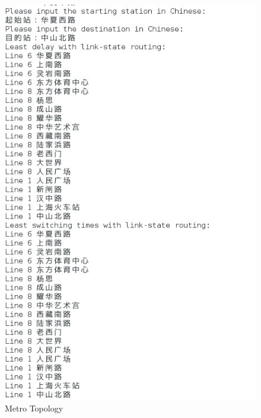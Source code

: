 \documentclass[12pt]{article}
\begin{document}
\begin{figure}[H]
	\begin{center}
		\includegraphics[width=1\textwidth]{figures/5}
	\end{center}
	\caption{Metro Topology}
	\label{1}
\end{figure}
\end{document}
